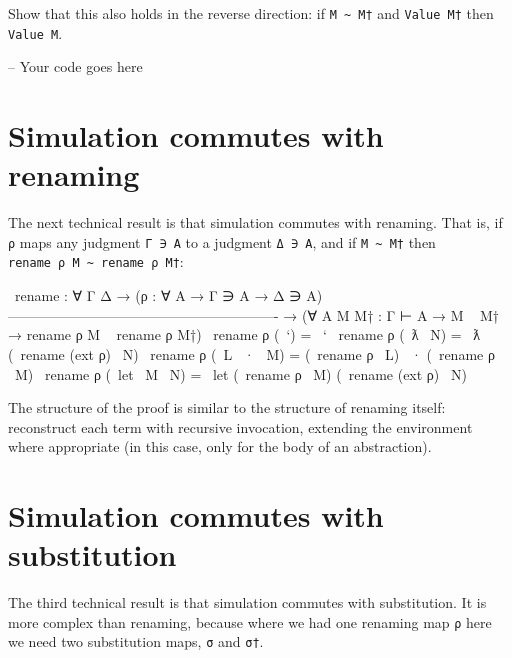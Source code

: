 Show that this also holds in the reverse direction: if
\texttt{M\ \textasciitilde{}\ M†} and \texttt{Value\ M†} then
\texttt{Value\ M}.

\begin{fence}
\begin{code}
-- Your code goes here
\end{code}
\end{fence}

\hypertarget{simulation-commutes-with-renaming}{%
\section{Simulation commutes with
renaming}\label{simulation-commutes-with-renaming}}

The next technical result is that simulation commutes with renaming.
That is, if \texttt{ρ} maps any judgment \texttt{Γ\ ∋\ A} to a judgment
\texttt{Δ\ ∋\ A}, and if \texttt{M\ \textasciitilde{}\ M†} then
\texttt{rename\ ρ\ M\ \textasciitilde{}\ rename\ ρ\ M†}:

\begin{fence}
\begin{code}
~rename : ∀ {Γ Δ}
  → (ρ : ∀ {A} → Γ ∋ A → Δ ∋ A)
    ----------------------------------------------------------
  → (∀ {A} {M M† : Γ ⊢ A} → M ~ M† → rename ρ M ~ rename ρ M†)
~rename ρ (~`)          =  ~`
~rename ρ (~ƛ ~N)       =  ~ƛ (~rename (ext ρ) ~N)
~rename ρ (~L ~· ~M)    =  (~rename ρ ~L) ~· (~rename ρ ~M)
~rename ρ (~let ~M ~N)  =  ~let (~rename ρ ~M) (~rename (ext ρ) ~N)
\end{code}
\end{fence}

The structure of the proof is similar to the structure of renaming
itself: reconstruct each term with recursive invocation, extending the
environment where appropriate (in this case, only for the body of an
abstraction).

\hypertarget{simulation-commutes-with-substitution}{%
\section{Simulation commutes with
substitution}\label{simulation-commutes-with-substitution}}

The third technical result is that simulation commutes with
substitution. It is more complex than renaming, because where we had one
renaming map \texttt{ρ} here we need two substitution maps, \texttt{σ}
and \texttt{σ†}.

